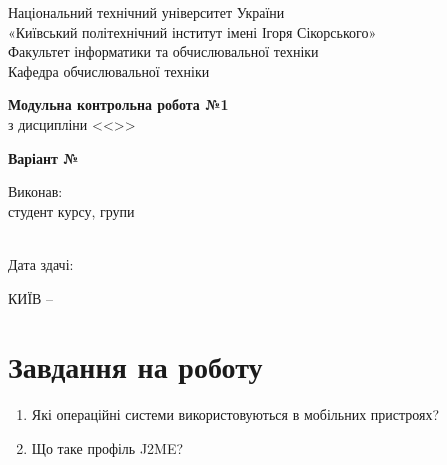\documentclass[14pt, a4paper]{extreport}
\begin{document}
	
	\begin{titlepage}
		\begin{center}
			\normalsize
			Національний технічний університет України\\
			«Київський політехнічний інститут імені Ігоря Сікорського» \\[0.5em]
			Факультет інформатики та обчислювальної техніки\\
			Кафедра обчислювальної техніки
			
			\vfill
			
			{\large \textbf{Модульна контрольна робота №1}\\[0.5em]}
			{з дисципліни <<\CourseTitle>>}
			
			\vspace{2em}
			
			\vspace{1em}
			
			{\textbf{Варіант №\Variant}}
			
			\vfill
			
			\begin{flushright}
				Виконав: \\ студент \CourseNumber{} курсу, групи \StudentGroup \\
				\StudentName \\[1em]
			\end{flushright}
			
			\vfill
			
			\begin{flushright}
				Дата здачі: \DTMtoday
			\end{flushright}
			
			\vspace{5em}
			КИЇВ -- \ReportYear
		\end{center}
	\end{titlepage}
	
	\clearpage
	\setcounter{page}{2}
	
	\section*{Завдання на роботу} 
	
	\begin{enumerate}
		\item Які операційні системи використовуються в мобільних пристроях?
		
		\item Що таке профіль J2ME?
	\end{enumerate}
	
\end{document}

